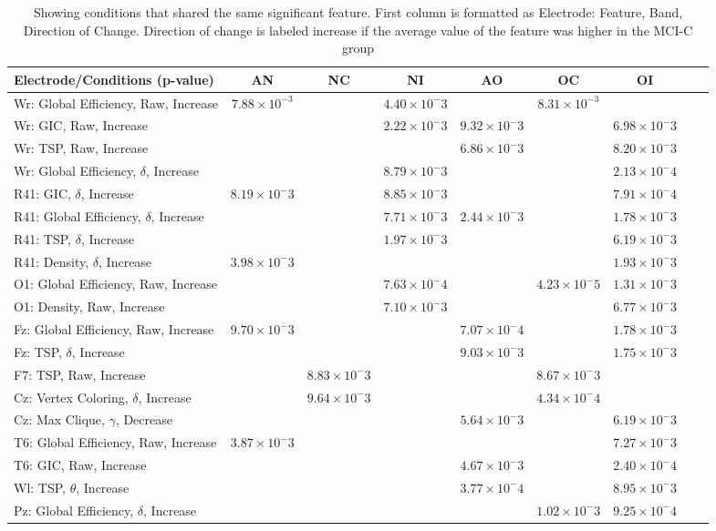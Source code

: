 \documentclass[Afour,times,sageh]{sagej}
\begin{document}
\begin{table}
\centering
\footnotesize
\begin{tabular}{l*{7}{c}r}
Electrode/Conditions (p-value) & AN & NC & NI & AO & OC & OI\\
\hline
Wr: Global Efficiency, Raw, Increase & $7.88 \times 10^{-3}$ & & $4.40 \times 10^-3$ & & $8.31 \times 10^{-3}$ &\\
Wr: GIC, Raw, Increase &&& $2.22 \times 10^-3$ &$9.32 \times 10^-3$& & $6.98 \times 10^-3$ \\
Wr: TSP, Raw, Increase &&&& $6.86 \times 10^-3$ &&$8.20 \times 10^-3$&\\
Wr: Global Efficiency, $\delta$, Increase &&&$8.79 \times 10^-3$&&&$2.13\times10^-4$ \\
R41: GIC, $\delta$, Increase & $8.19\times10^-3$ &&$8.85 \times 10^-3$ &&&$7.91 \times 10^-4$\\
R41: Global Efficiency, $\delta$, Increase &&&$7.71 \times 10^-3$&$2.44\times10^-3$&&$1.78\times10^-3$\\
R41: TSP, $\delta$, Increase &&&$1.97 \times 10^-3$&&&$6.19 \times 10 ^-3$\\
R41: Density, $\delta$, Increase &$3.98 \times 10^-3$&&&&&$1.93 \times 10^-3$\\
O1: Global Efficiency, Raw, Increase &&&$7.63 \times 10^-4$&&$4.23 \times 10^-5$&$1.31 \times 10^-3$\\
O1: Density, Raw, Increase &&&$7.10 \times 10^-3$&&&$6.77 \times 10^-3$ \\
Fz: Global Efficiency, Raw, Increase &$9.70 \times 10^-3$&&&$7.07 \times 10^-4$&&$1.78 \times 10^-3$ \\
Fz: TSP, $\delta$, Increase &&&&$9.03 \times 10^-3$&&$1.75 \times 10^-3$ \\
F7: TSP, Raw, Increase &&$8.83 \times 10^-3$&&&$8.67 \times 10^-3$&\\
Cz: Vertex Coloring, $\delta$, Increase &&$9.64 \times 10^-3$&&&$4.34 \times 10^-4$&\\
Cz: Max Clique, $\gamma$, Decrease &&&&$5.64 \times 10^-3$&&$6.19 \times 10^-3$ \\
T6: Global Efficiency, Raw, Increase &$3.87 \times 10^-3$&&&&&$7.27 \times 10^-3$\\
T6: GIC, Raw, Increase &&&&$4.67 \times 10^-3$&&$2.40 \times 10^-4$ \\
Wl: TSP, $\theta$, Increase &&&&$3.77 \times 10^-4$&&$8.95 \times 10^-3$\\
Pz: Global Efficiency, $\delta$, Increase &&&&&$1.02 \times 10^-3$&$9.25 \times 10^-4$\\
\end{tabular}
\caption{Showing conditions that shared the same significant feature. First column is formatted as Electrode: Feature, Band, Direction of Change. Direction of change is labeled increase if the average value of the feature was higher in the MCI-C group}
\label{T4}
\end{table}
\end{document}

